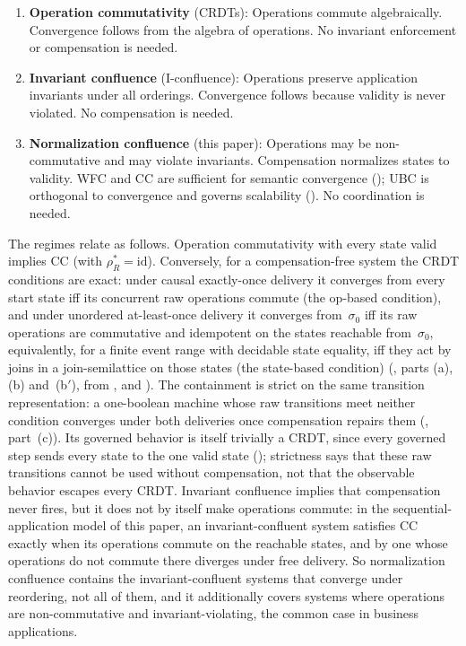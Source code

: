 \documentclass[11pt,a4paper]{article}
\theoremstyle{plain}
\theoremstyle{definition}
\theoremstyle{remark}
\begin{document}
\begin{enumerate}[leftmargin=*,nosep]
\item \textbf{Operation commutativity} (CRDTs): Operations commute
  algebraically.  Convergence follows from the algebra of operations.  No
  invariant enforcement or compensation is needed.
\item \textbf{Invariant confluence} (I-confluence): Operations preserve
  application invariants under all orderings.  Convergence follows because
  validity is never violated.  No compensation is needed.
\item \textbf{Normalization confluence} (this paper): Operations may be
  non-commutative and may violate invariants.  Compensation normalizes states
  to validity.  WFC and CC are sufficient for semantic convergence
  (); UBC is orthogonal to convergence and governs
  scalability ().  No coordination is needed.
\end{enumerate}

The regimes relate as follows.  Operation commutativity with every state
valid implies CC (with $\rho_R^* = \mathrm{id}$).  Conversely, for a
compensation-free system the CRDT conditions are exact: under causal
exactly-once delivery it converges from every start state iff its concurrent
raw operations commute (the op-based condition), and under unordered
at-least-once delivery it converges from~$\sigma_0$ iff its raw operations are
commutative and idempotent on the states reachable from~$\sigma_0$,
equivalently, for a finite event range with decidable state equality, iff
they act by joins in a join-semilattice on those states (the state-based
condition) (, parts (a), (b) and~(b$'$), from
,  and
).  The containment is strict on the same transition
representation: a one-boolean machine whose raw transitions meet neither
condition converges under both deliveries once compensation repairs them
(, part~(c)).  Its governed behavior is itself trivially a
CRDT, since every governed step sends every state to the one valid state
(); strictness says that these raw transitions
cannot be used without compensation, not that the observable behavior escapes
every CRDT.  Invariant confluence implies that compensation never fires,
but it does not by itself make operations commute: in the
sequential-application model of this paper, an invariant-confluent system
satisfies CC exactly when its operations commute on the reachable states, and
by  one whose operations do not commute there diverges
under free delivery.  So normalization confluence contains the
invariant-confluent systems that converge under reordering, not all of them,
and it additionally covers systems where operations are non-commutative and
invariant-violating, the common case in business applications.
\end{document}

